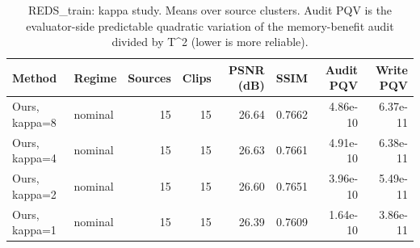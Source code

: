 \begin{table}[t]
\centering
\caption{REDS\_train: kappa study. Means over source clusters. Audit PQV is the evaluator-side predictable quadratic variation of the memory-benefit audit divided by T^2 (lower is more reliable).}
\label{tab:kappa_REDS_train}
\small
\begin{tabular}{llrrrrrr}
\toprule
Method & Regime & Sources & Clips & PSNR (dB) & SSIM & Audit PQV & Write PQV \\
\midrule
Ours, kappa=8 & nominal & 15 & 15 & 26.64 & 0.7662 & 4.86e-10 & 6.37e-11 \\
Ours, kappa=4 & nominal & 15 & 15 & 26.63 & 0.7661 & 4.91e-10 & 6.38e-11 \\
Ours, kappa=2 & nominal & 15 & 15 & 26.60 & 0.7651 & 3.96e-10 & 5.49e-11 \\
Ours, kappa=1 & nominal & 15 & 15 & 26.39 & 0.7609 & 1.64e-10 & 3.86e-11 \\
\bottomrule
\end{tabular}
\end{table}
